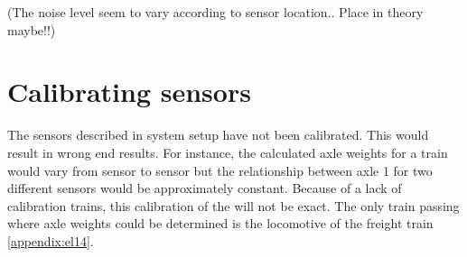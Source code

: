 (The noise level seem to vary according to sensor location.. Place in theory maybe!!)

\section{Calibrating sensors}
The sensors described in system setup have not been calibrated. This would result in wrong end results. For instance, the calculated axle weights for a train would vary from sensor to sensor but the relationship between axle 1 for two different sensors would be approximately constant.
Because of a lack of calibration trains, this calibration of the will not be exact. The only train passing where axle weights could be determined is the locomotive of the freight train \ref{appendix:el14}.
